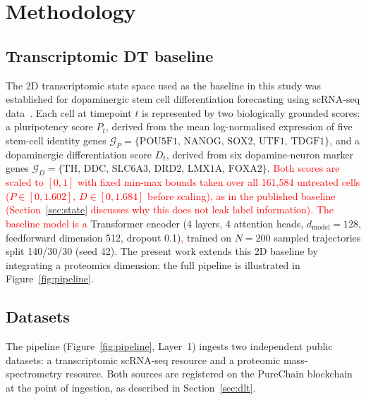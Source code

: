 \documentclass[5p,times,twocolumn]{elsarticle}
\newcommand{\rtag}[1]{}
\newcommand{\rev}[2]{\rtag{#1}\textcolor{red}{#2}}
\newcommand{\lang}[1]{\textcolor{red}{#1}}
\begin{document}
\section{Methodology}

\subsection{\textbf{Transcriptomic DT baseline}}
\label{sec:baseline}

The 2D transcriptomic state space used as
the baseline in this study was established for dopaminergic
stem cell differentiation forecasting using scRNA-seq data~\cite{kanu2026transformer}.
Each cell at timepoint $t$ is represented by two biologically
grounded scores: a pluripotency score $P_{t}$, derived from
the mean log-normalised expression of five stem-cell identity
genes
$\mathcal{G}_{P} = \{\text{POU5F1, NANOG, SOX2, UTF1, TDGF1}\}$,
and a dopaminergic differentiation score $D_{t}$, derived
from six dopamine-neuron marker genes
$\mathcal{G}_{D} = \{\text{TH, DDC, SLC6A3, DRD2, LMX1A, FOXA2}\}$.
\rev{R2.6,AC}{Both scores are scaled to $[0,1]$ with fixed
  min-max bounds taken over all 161,584 untreated cells
  ($P \in [0, 1.602]$, $D \in [0, 1.684]$ before scaling), as in
  the published baseline (Section~\ref{sec:state} discusses why
  this does not leak label information).}
\lang{The baseline model is a} Transformer encoder (4 layers, 4 attention heads,
$d_{\text{model}} = 128$, feedforward dimension 512,
dropout 0.1)\lang{,} trained on $N = 200$ sampled trajectories
split 140/30/30 (seed 42).
The present work extends this 2D baseline by integrating
a proteomics dimension; the full pipeline is illustrated
in Figure~\ref{fig:pipeline}.

\subsection{\textbf{Datasets}}
\label{sec:datasets}

The pipeline (Figure~\ref{fig:pipeline}, Layer~1) ingests two
independent public datasets: a transcriptomic scRNA-seq
resource and a proteomic mass-spectrometry resource.
Both sources are registered on the PureChain blockchain at
the point of ingestion, as described in
Section~\ref{sec:dlt}.
\end{document}
